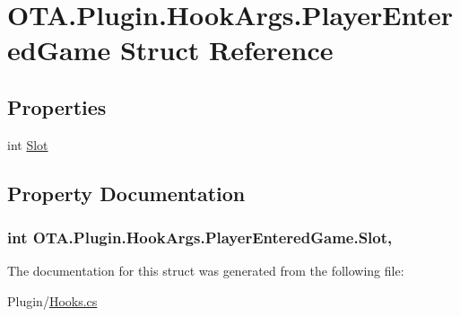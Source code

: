\hypertarget{struct_o_t_a_1_1_plugin_1_1_hook_args_1_1_player_entered_game}{}\section{O\+T\+A.\+Plugin.\+Hook\+Args.\+Player\+Entered\+Game Struct Reference}
\label{struct_o_t_a_1_1_plugin_1_1_hook_args_1_1_player_entered_game}
\subsection*{Properties}
\begin{DoxyCompactItemize}
\item 
int \hyperlink{struct_o_t_a_1_1_plugin_1_1_hook_args_1_1_player_entered_game_ab6e76e9c0f0841aef7a20a9478e9f596}{Slot}
\end{DoxyCompactItemize}


\subsection{Property Documentation}
\hypertarget{struct_o_t_a_1_1_plugin_1_1_hook_args_1_1_player_entered_game_ab6e76e9c0f0841aef7a20a9478e9f596}{}
\subsubsection[{Slot}]{\setlength{\rightskip}{0pt plus 5cm}int O\+T\+A.\+Plugin.\+Hook\+Args.\+Player\+Entered\+Game.\+Slot\hspace{0.3cm}{\ttfamily [get]}, {\ttfamily [set]}}\label{struct_o_t_a_1_1_plugin_1_1_hook_args_1_1_player_entered_game_ab6e76e9c0f0841aef7a20a9478e9f596}


The documentation for this struct was generated from the following file\+:\begin{DoxyCompactItemize}
\item 
Plugin/\hyperlink{_hooks_8cs}{Hooks.\+cs}\end{DoxyCompactItemize}
